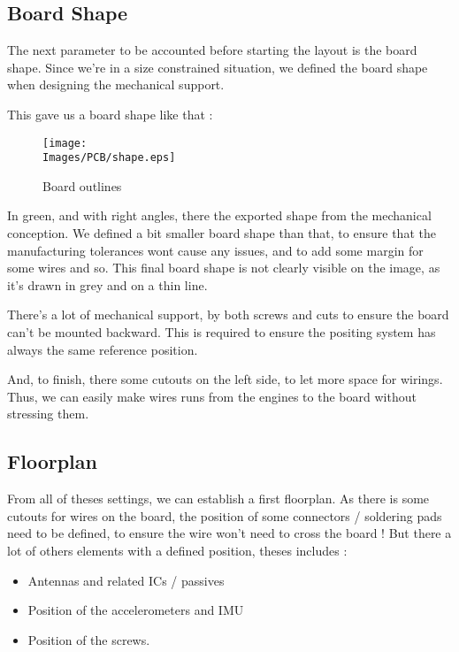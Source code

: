 \subsection{Board Shape}
The next parameter to be accounted before starting the layout is the board shape. Since
we're in a size constrained situation, we defined the board shape when designing the
mechanical support.

This gave us a board shape like that :

\begin{figure}
    \centering
    \texttt{[image: \\Images/PCB/shape.eps]}
    \caption{Board outlines}
    \label{img:board_shape}
\end{figure}

In green, and with right angles, there the exported shape from the mechanical conception.
We defined a bit smaller board shape than that, to ensure that the manufacturing tolerances
wont cause any issues, and to add some margin for some wires and so. This final board shape
is not clearly visible on the image, as it's drawn in grey and on a thin line.

There's a lot of mechanical support, by both screws and cuts to ensure the board can't be
mounted backward. This is required to ensure the positing system has always the same
reference position.

And, to finish, there some cutouts on the left side, to let more space for wirings. Thus, we
can easily make wires runs from the engines to the board without stressing them.

\subsection{Floorplan}
From all of theses settings, we can establish a first floorplan. As there is some cutouts for
wires on the board, the position of some connectors / soldering pads need to be defined, to
ensure the wire won't need to cross the board !
But there a lot of others elements with a defined position, theses includes :

\begin{itemize}
    \item   Antennas and related ICs / passives
    \item   Position of the accelerometers and IMU
    \item   Position of the screws.
\end{itemize}